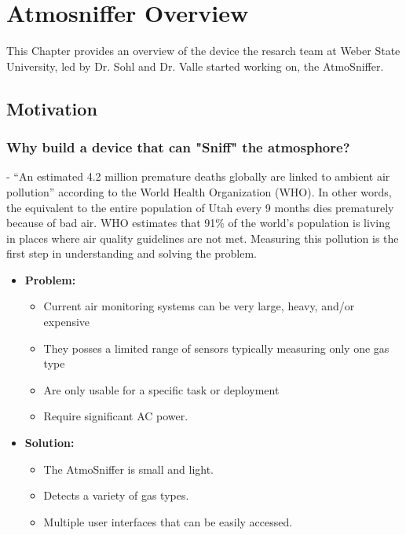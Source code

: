 \chapter{Atmosniffer Overview} %
This Chapter provides an overview of the device the resarch team at Weber State University, led by Dr. Sohl and Dr. Valle started working on, the AtmoSniffer.

\section{Motivation}

\subsection{Why build a device that can "Sniff" the atmosphore?}
- “An estimated 4.2 million premature deaths globally are linked to ambient air pollution” according to the World Health Organization (WHO). In other words, the equivalent to the entire population of Utah every 9 months dies prematurely because of bad air. WHO estimates that 91\% of the world’s population is living in places where air quality guidelines are not met. Measuring this pollution is the first step in understanding and solving the problem. 


\begin{itemize}
\item \textbf{Problem:}
	\begin{itemize}
	\item Current air monitoring systems can be very large, heavy, and/or expensive
	\item They posses a limited range of sensors typically measuring only one gas type
	\item Are only usable for a specific task or deployment
	\item Require significant AC power.
	\end{itemize}

\item \textbf{Solution:}
	\begin{itemize}
	\item The AtmoSniffer is small and light.
	\item Detects a variety of gas types.
	\item Multiple user interfaces that can be easily accessed.
	\end{itemize}

\end{itemize}

